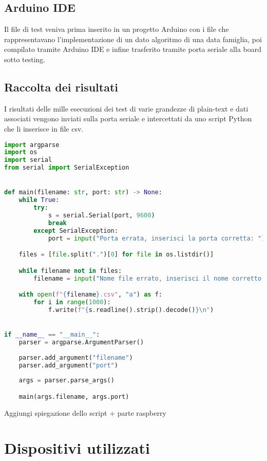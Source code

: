 \documentclass{report}
\begin{document}
\subsection{Arduino IDE}

Il file di test veniva prima inserito in un progetto Arduino con i file che rappresentavano l'implementazione di un dato algoritmo di una data famiglia, poi compilato tramite Arduino IDE e infine trasferito tramite porta seriale alla board sotto testing. 


\subsection{Raccolta dei risultati}

I risultati delle mille esecuzioni dei test di varie grandezze di plain-text e dati associati vengono inviati sulla porta seriale e intercettati da uno script Python che li inserisce in file csv.

\begin{lstlisting}[language=Python]
import argparse
import os
import serial
from serial import SerialException


def main(filename: str, port: str) -> None:
    while True:
        try:
            s = serial.Serial(port, 9600)
            break
        except SerialException:
            port = input("Porta errata, inserisci la porta corretta: ")

    files = [file.split(".")[0] for file in os.listdir()]

    while filename not in files:
        filename = input("Nome file errato, inserisci il nome corretto: ")

    with open(f"{filename}.csv", "a") as f:
        for i in range(1000):
            f.write(f"{s.readline().strip().decode()}\n")


if __name__ == "__main__":
    parser = argparse.ArgumentParser()
    
    parser.add_argument("filename")
    parser.add_argument("port")
    
    args = parser.parse_args()

    main(args.filename, args.port)
\end{lstlisting}

Aggiungi spiegazione dello script + parte raspberry

\section{Dispositivi utilizzati}
\end{document}
